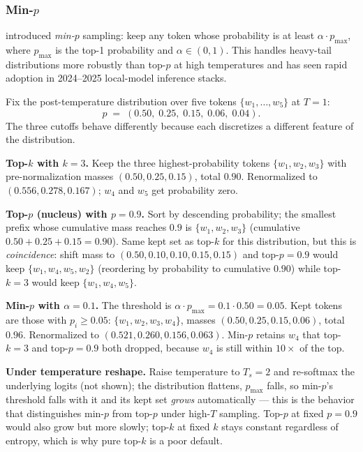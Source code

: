 \subsubsection{\texorpdfstring{Min-$p$}{Min-p}}

\citet{nguyen2024minp} introduced \emph{min-$p$} sampling: keep any
token whose probability is at least $\alpha \cdot p_{\max}$, where
$p_{\max}$ is the top-1 probability and $\alpha \in (0, 1)$. This
handles heavy-tail distributions more robustly than top-$p$ at high
temperatures and has seen rapid adoption in 2024--2025 local-model
inference stacks.

\begin{workedexample}
Fix the post-temperature distribution over five tokens
$\{w_1, \ldots, w_5\}$ at $T = 1$:
\[
p \;=\; (0.50,\; 0.25,\; 0.15,\; 0.06,\; 0.04).
\]
The three cutoffs behave differently because each discretizes a
different feature of the distribution.

\textbf{Top-$k$ with $k = 3$.} Keep the three highest-probability
tokens $\{w_1, w_2, w_3\}$ with pre-normalization masses
$(0.50, 0.25, 0.15)$, total $0.90$. Renormalized to
$(0.556, 0.278, 0.167)$; $w_4$ and $w_5$ get probability zero.

\textbf{Top-$p$ (nucleus) with $p = 0.9$.}
Sort by descending probability; the smallest prefix whose cumulative
mass reaches $0.9$ is $\{w_1, w_2, w_3\}$ (cumulative
$0.50 + 0.25 + 0.15 = 0.90$). Same kept set as top-$k$ for this
distribution, but this is \emph{coincidence}: shift mass to
$(0.50, 0.10, 0.10, 0.15, 0.15)$ and top-$p = 0.9$ would keep
$\{w_1, w_4, w_5, w_2\}$ (reordering by probability to cumulative
$0.90$) while top-$k = 3$ would keep $\{w_1, w_4, w_5\}$.

\textbf{Min-$p$ with $\alpha = 0.1$.} The threshold is
$\alpha \cdot p_{\max} = 0.1 \cdot 0.50 = 0.05$. Kept tokens are
those with $p_i \ge 0.05$: $\{w_1, w_2, w_3, w_4\}$, masses
$(0.50, 0.25, 0.15, 0.06)$, total $0.96$. Renormalized to
$(0.521, 0.260, 0.156, 0.063)$. Min-$p$ retains $w_4$ that top-$k=3$
and top-$p=0.9$ both dropped, because $w_4$ is still within $10\times$
of the top.

\textbf{Under temperature reshape.} Raise temperature to $T_s = 2$
and re-softmax the underlying logits (not shown); the distribution
flattens, $p_{\max}$ falls, so min-$p$'s threshold falls with it and
its kept set \emph{grows} automatically — this is the behavior that
distinguishes min-$p$ from top-$p$ under high-$T$ sampling. Top-$p$
at fixed $p = 0.9$ would also grow but more slowly; top-$k$ at fixed
$k$ stays constant regardless of entropy, which is why pure top-$k$
is a poor default.
\end{workedexample}

